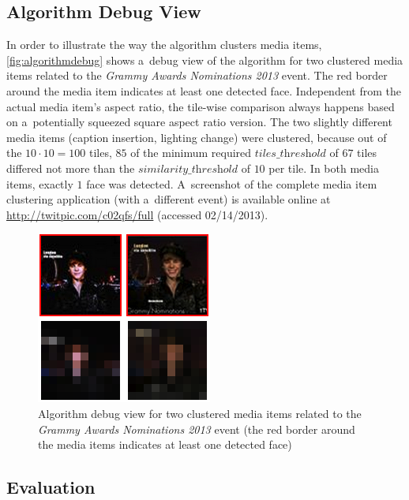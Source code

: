 \subsection{Algorithm Debug View}
\label{sec:algorithm-debug-view}

In order to illustrate the way the algorithm clusters media items,
\autoref{fig:algorithmdebug} shows a~debug view of the algorithm
for two clustered media items related to the 
\emph{Grammy Awards Nominations 2013} event.
The red border around the media item indicates at least one detected face.
Independent from the actual media item's aspect ratio,
the tile-wise comparison always happens based on a~potentially squeezed
square aspect ratio version.
The two slightly different media items (caption insertion, lighting change)
were clustered, because out of the $10 \cdot 10 = 100$ tiles,
$85$ of the minimum required $\textit{tiles\_threshold}$ of $67$ tiles differed not more
than the $\textit{similarity\_threshold}$ of $10$ per tile.
In both media items, exactly $1$ face was detected.
A~screenshot of the complete media item clustering application (with a~different event)
is available online at \url{http://twitpic.com/c02qfs/full} (accessed 02/14/2013).

\begin{figure}
  \centering
  \includegraphics[width=0.5\linewidth]{./algorithmdebug.png}
  \caption[Algorithm debug view for two clustered media items]
  {Algorithm debug view for two clustered media items
  related to the \emph{Grammy Awards Nominations 2013} event
  (the red border around the media items indicates at least one detected face)}
  \label{fig:algorithmdebug}
\end{figure}



\subsection{Evaluation}\label{sec:evaluation-chpater6}

